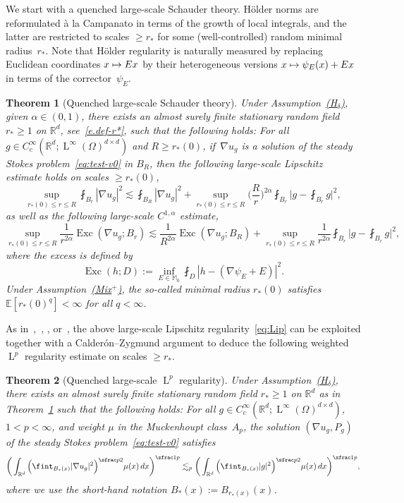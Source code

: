 \documentclass[10pt]{amsart}
\newcommand\mto{\mathchoice{\longmapsto}{\mapsto}{\mapsto}{\mapsto}}
\newcommand{\Hd}{\hyperref[Hd]{\textup{(H$_\delta$)}}\xspace}
\newcommand{\Mix}{\hyperref[Mix+]{\textup{(Mix$^+$)}}\xspace}
\theoremstyle{plain}
\newtheorem{theor1}{Theorem}
\theoremstyle{definition}
\newcommand{\Exc}{\operatorname{Exc}}
\newcommand{\R}{\mathbb R}
\newcommand{\Md}{\mathbb M}
\newcommand{\Ld}{\operatorname{L}}
\newcommand{\expec}[1]{\mathbb{E}\left[ #1 \right]}
\begin{document}
We start with a quenched large-scale Schauder theory.
Hölder norms are reformulated à la Campanato in terms of the growth of local integrals, and the latter are restricted to scales $\ge r_*$ for some (well-controlled) random minimal radius~$r_*$.
Note that Hölder regularity is naturally measured by replacing Euclidean coordinates $x\mto Ex$ by their heterogeneous versions $x\mto \psi_E(x)+Ex$ in terms of the corrector~$\psi_E$.

\begin{theor1}[Quenched large-scale Schauder theory]\label{th:schauder}
Under Assumption~\Hd, given \mbox{$\alpha\in(0,1)$}, there exists an almost surely finite stationary random field $r_*\ge1$ on $\R^d$, see~\eqref{e.def-r*}, such that the following holds: For all $g\in C^\infty_c(\R^d;\Ld^\infty(\Omega)^{d\times d})$ and $R\ge r_*(0)$, if~$\nabla u_g$ is a solution of the steady Stokes problem~\eqref{eq:test-v0} in $B_R$, then the following large-scale Lipschitz estimate holds on scales $\ge r_*(0)$,
\begin{equation}\label{eq:Lip}
\sup_{r_*(0)\le r\le R} \fint_{B_r} |\nabla u_g|^2 \lesssim \fint_{B_R} |\nabla u_g|^2+ \sup_{r_*(0)\le r\le R} \Big(\frac R r\Big)^{2\alpha}\fint_{B_r} \Big|g-\fint_{B_r}g\Big|^2,
\end{equation}
as well as the following large-scale $C^{1,\alpha}$ estimate,
\begin{equation*}\label{eq:C1a}
\sup_{r_*(0)\le r\le R}\frac1{r^{2\alpha}}\Exc(\nabla u_g;B_r) \lesssim \frac1{R^{2\alpha}} \Exc(\nabla u_g;B_R)+\sup_{r_*(0)\le r\le R} \frac1{r^{2\alpha}} \fint_{B_r} \Big|g-\fint_{B_r}g\Big|^2,
\end{equation*}
where the excess is defined by
\begin{equation}\label{eq:def-exc}
\Exc(h;D):=\inf_{E\in\Md_0}\fint_D|h-(\nabla\psi_E+E)|^2.
\end{equation}
Under Assumption~\Mix, the so-called minimal radius $r_*(0)$ satisfies \mbox{$\expec{r_*(0)^q}<\infty$} for all $q<\infty$.
\end{theor1}
As in~\cite{Armstrong-Daniel-16},~\cite[\S 7]{AKM-book}, \cite[Cor.\,4]{GNO-reg}, or~\cite[Prop.\,6.4]{DO1}, the above large-scale Lipschitz regularity~\eqref{eq:Lip} can be exploited together with a Calderón--Zygmund argument to deduce the following weighted $\Ld^p$ regularity estimate on scales $\ge r_*$.
\begin{theor1}[Quenched large-scale $\Ld^p$ regularity]\label{th:lp-reg}
Under Assumption~\Hd, there exists an almost surely finite stationary random field $r_*\ge1$ on $\R^d$ as in Theorem~\ref{th:schauder} such that the following holds: For all $g\in C^\infty_c(\R^d;\Ld^\infty(\Omega)^{d\times d})$, $1<p<\infty$, and weight $\mu$ in the Muckenhoupt class~$A_p$,
the solution $(\nabla u_g,P_g)$ of the steady Stokes problem~\eqref{eq:test-v0} satisfies
\[\bigg(\int_{\R^d}\Big(\fint_{B_*(x)}|\nabla u_g|^2\Big)^{\sfrac p2}\mu(x)\,dx\bigg)^{\sfrac1p}\lesssim_p \bigg(\int_{\R^d}\Big(\fint_{B_*(x)}|g|^2\Big)^{\sfrac p2}\mu(x)\,dx\bigg)^{\sfrac1p},\]
where we use the short-hand notation $B_*(x):=B_{r_*(x)}(x)$.
\end{theor1}
\end{document}
